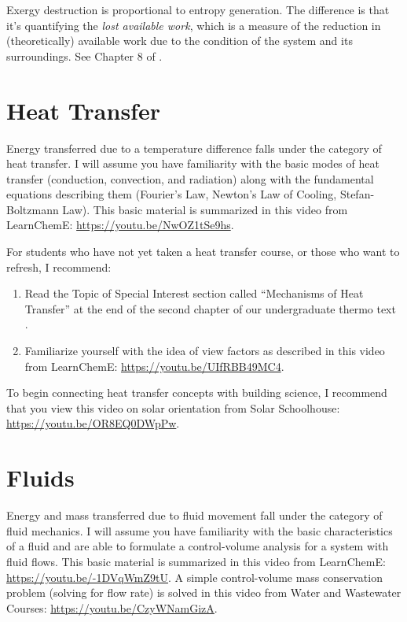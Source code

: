 \documentclass[10pt]{article}
\begin{document}
Exergy destruction is proportional to entropy generation. The difference is that it's quantifying the \textit{lost available work}, which is a measure of the reduction in (theoretically) available work due to the condition of the system and its surroundings. See Chapter 8 of \cite{cengel}.

\section{Heat Transfer}

Energy transferred due to a temperature difference falls under the category of heat transfer. I will assume you have familiarity with the basic modes of heat transfer (conduction, convection, and radiation) along with the fundamental equations describing them (Fourier's Law, Newton's Law of Cooling, Stefan-Boltzmann Law). This basic material is summarized in this video from LearnChemE: \url{https://youtu.be/NwOZ1tSe9hs}.

For students who have not yet taken a heat transfer course, or those who want to refresh, I recommend:

\begin{enumerate}
\item Read the Topic of Special Interest section called ``Mechanisms of Heat Transfer'' at the end of the second chapter of our undergraduate thermo text \cite{cengel}. 
\item Familiarize yourself with the idea of view factors as described in this video from LearnChemE: \url{https://youtu.be/UIfRBB49MC4}.
\end{enumerate}

To begin connecting heat transfer concepts with building science, I recommend that you view this video on solar orientation from Solar Schoolhouse: \url{https://youtu.be/OR8EQ0DWpPw}.

\section{Fluids}

Energy and mass transferred due to fluid movement fall under the category of fluid mechanics. I will assume you have familiarity with the basic characteristics of a fluid and are able to formulate a control-volume analysis for a system with fluid flows. This basic material is summarized in this video from LearnChemE: \url{https://youtu.be/-1DVqWmZ9tU}. A simple  control-volume mass conservation problem (solving for flow rate) is solved in this video from 
Water and Wastewater Courses: \url{https://youtu.be/CzyWNamGizA}.
\end{document}
